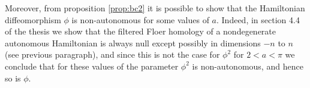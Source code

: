 Moreover, from proposition \ref{prop:bc2} it is possible to show that the Hamiltonian diffeomorphism $\phi$ is non-autonomous for some values of $a$. Indeed, in section 4.4 of the thesis we show that the filtered Floer homology of a nondegenerate autonomous Hamiltonian is always null except possibly in dimensions $-n$ to $n$ (see previous paragraph), and since this is not the case for $\phi^2$ for $2 < a < \pi$ we conclude that for these values of the parameter $\phi^2$ is non-autonomous, and hence so is $\phi$.